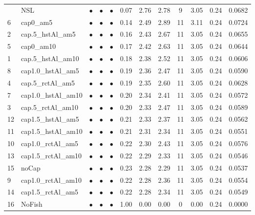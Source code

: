 \documentclass[11pt]{book}
\begin{document}
\begin{landscape}
\begin{longtable}[t]{llcccccccccc}
\midrule
\endhead
\
\endfoot
\bottomrule
\endlastfoot
17 & NSL & $\bullet$ & $\bullet$ & $\bullet$ & 0.07 & 2.76 & 2.78 & 9 & 3.05 & 0.24 & 0.0682\\
6 & cap0\_am5 & $\bullet$ & $\bullet$ & $\bullet$ & 0.14 & 2.49 & 2.89 & 11 & 3.11 & 0.24 & 0.0724\\
2 & cap.5\_hstAl\_am5 & $\bullet$ & $\bullet$ & $\bullet$ & 0.16 & 2.43 & 2.67 & 11 & 3.05 & 0.24 & 0.0655\\
5 & cap0\_am10 & $\bullet$ & $\bullet$ & $\bullet$ & 0.17 & 2.42 & 2.63 & 11 & 3.05 & 0.24 & 0.0644\\
1 & cap.5\_hstAl\_am10 & $\bullet$ & $\bullet$ & $\bullet$ & 0.18 & 2.38 & 2.52 & 11 & 3.05 & 0.24 & 0.0606\\
8 & cap1.0\_hstAl\_am5 & $\bullet$ & $\bullet$ & $\bullet$ & 0.19 & 2.36 & 2.47 & 11 & 3.05 & 0.24 & 0.0590\\
4 & cap.5\_rctAl\_am5 & $\bullet$ & $\bullet$ & $\bullet$ & 0.19 & 2.35 & 2.60 & 11 & 3.05 & 0.24 & 0.0628\\
7 & cap1.0\_hstAl\_am10 & $\bullet$ & $\bullet$ & $\bullet$ & 0.20 & 2.34 & 2.41 & 11 & 3.05 & 0.24 & 0.0572\\
3 & cap.5\_rctAl\_am10 & $\bullet$ & $\bullet$ & $\bullet$ & 0.20 & 2.33 & 2.47 & 11 & 3.05 & 0.24 & 0.0589\\
12 & cap1.5\_hstAl\_am5 & $\bullet$ & $\bullet$ & $\bullet$ & 0.21 & 2.33 & 2.37 & 11 & 3.05 & 0.24 & 0.0562\\
11 & cap1.5\_hstAl\_am10 & $\bullet$ & $\bullet$ & $\bullet$ & 0.21 & 2.31 & 2.34 & 11 & 3.05 & 0.24 & 0.0551\\
10 & cap1.0\_rctAl\_am5 & $\bullet$ & $\bullet$ & $\bullet$ & 0.22 & 2.30 & 2.43 & 11 & 3.05 & 0.24 & 0.0576\\
13 & cap1.5\_rctAl\_am10 & $\bullet$ & $\bullet$ & $\bullet$ & 0.22 & 2.29 & 2.33 & 11 & 3.05 & 0.24 & 0.0546\\
15 & noCap & $\bullet$ & $\bullet$ & $\bullet$ & 0.23 & 2.28 & 2.29 & 11 & 3.05 & 0.24 & 0.0537\\
9 & cap1.0\_rctAl\_am10 & $\bullet$ & $\bullet$ & $\bullet$ & 0.22 & 2.28 & 2.36 & 11 & 3.05 & 0.24 & 0.0554\\
14 & cap1.5\_rctAl\_am5 & $\bullet$ & $\bullet$ & $\bullet$ & 0.22 & 2.28 & 2.34 & 11 & 3.05 & 0.24 & 0.0549\\
16 & NoFish & $\bullet$ & $\bullet$ & $\bullet$ & 1.00 & 0.00 & 0.00 & 0 & 0.00 & 0.24 & 0.0000\\*
\end{longtable}
\endgroup{}
\end{landscape}
\endgroup{}
\end{document}
